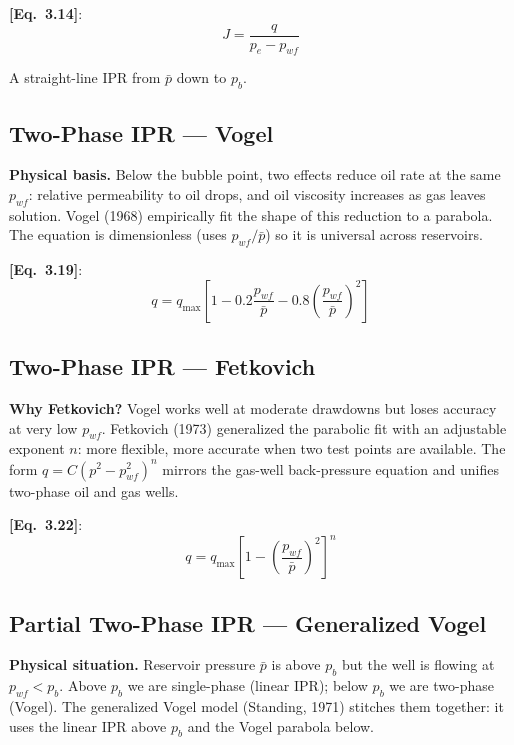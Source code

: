 \documentclass[11pt,a4paper,openany]{book}
\newcommand{\eqrefbook}[1]{\textcolor{blue!60!black}{\textbf{[Eq.~#1]}}}
\begin{document}
\eqrefbook{3.14}:
\begin{equation}
  J = \frac{q}{p_e - p_{wf}}
\end{equation}

A straight-line IPR from $\bar{p}$ down to $p_b$.

\subsection{Two-Phase IPR — Vogel}

\begin{theory}
\textbf{Physical basis.} Below the bubble point, two effects reduce
oil rate at the same $p_{wf}$: relative permeability to oil drops,
and oil viscosity increases as gas leaves solution. Vogel (1968)
empirically fit the shape of this reduction to a parabola. The
equation is dimensionless (uses $p_{wf}/\bar{p}$) so it is universal
across reservoirs.
\end{theory}

\eqrefbook{3.19}:
\begin{equation}
  q = q_{\max}\left[1 - 0.2\frac{p_{wf}}{\bar{p}}
    - 0.8\left(\frac{p_{wf}}{\bar{p}}\right)^2\right]
\end{equation}

\subsection{Two-Phase IPR — Fetkovich}

\begin{theory}
\textbf{Why Fetkovich?} Vogel works well at moderate drawdowns but
loses accuracy at very low $p_{wf}$. Fetkovich (1973) generalized the
parabolic fit with an adjustable exponent $n$: more flexible, more
accurate when two test points are available. The form
$q = C(p^2 - p_{wf}^2)^n$ mirrors the gas-well back-pressure equation
and unifies two-phase oil and gas wells.
\end{theory}

\eqrefbook{3.22}:
\begin{equation}
  q = q_{\max}\left[1 - \left(\frac{p_{wf}}{\bar{p}}\right)^2
  \right]^n
\end{equation}

\subsection{Partial Two-Phase IPR — Generalized Vogel}

\begin{theory}
\textbf{Physical situation.} Reservoir pressure $\bar{p}$ is above
$p_b$ but the well is flowing at $p_{wf} < p_b$. Above $p_b$ we are
single-phase (linear IPR); below $p_b$ we are two-phase (Vogel).
The generalized Vogel model (Standing, 1971) stitches them together:
it uses the linear IPR above $p_b$ and the Vogel parabola below.
\end{theory}
\end{document}
